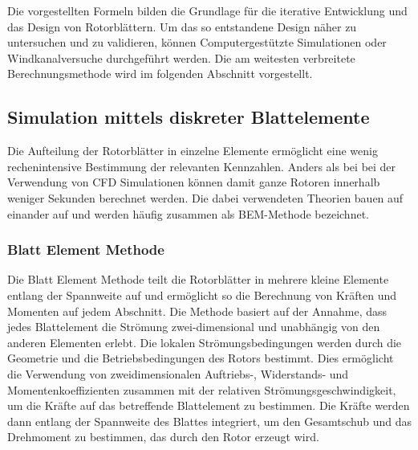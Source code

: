 Die vorgestellten Formeln bilden die Grundlage für die iterative Entwicklung und das Design von Rotorblättern. Um das so entstandene Design näher zu untersuchen und zu validieren, können Computergestützte Simulationen oder Windkanalversuche durchgeführt werden. Die am weitesten verbreitete Berechnungsmethode wird im folgenden Abschnitt vorgestellt.

\subsection{Simulation mittels diskreter Blattelemente}
Die Aufteilung der Rotorblätter in einzelne Elemente ermöglicht eine wenig rechenintensive Bestimmung der relevanten Kennzahlen. Anders als bei bei der Verwendung von CFD Simulationen können damit ganze Rotoren innerhalb weniger Sekunden berechnet werden.
Die dabei verwendeten Theorien bauen auf einander auf und werden häufig zusammen als BEM-Methode bezeichnet.

\subsubsection{Blatt Element Methode}
Die Blatt Element Methode teilt die Rotorblätter in mehrere kleine Elemente entlang der Spannweite auf und ermöglicht so die Berechnung von Kräften und Momenten auf jedem Abschnitt.
Die Methode basiert auf der Annahme, dass jedes Blattelement die Strömung zwei-dimensional und unabhängig von den anderen Elementen erlebt. Die lokalen Strömungsbedingungen werden durch die Geometrie und die Betriebsbedingungen des Rotors bestimmt. \cite{branlard_wind_2017}
Dies ermöglicht die Verwendung von zweidimensionalen Auftriebs-, Widerstands- und Momentenkoeffizienten zusammen mit der relativen Strömungsgeschwindigkeit, um die Kräfte auf das betreffende Blattelement zu bestimmen.
Die Kräfte werden dann entlang der Spannweite des Blattes integriert, um den Gesamtschub und das Drehmoment zu bestimmen, das durch den Rotor erzeugt wird.

